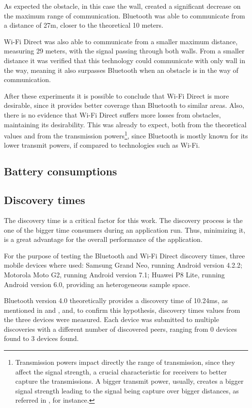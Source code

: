 As expected the obstacle, in this case the wall, created a significant decrease on the maximum range of communication. Bluetooth was able to communicate from a distance of 27m, closer to the theoretical 10 meters.

Wi-Fi Direct was also able to communicate from a smaller maximum distance, measuring 29 meters, with the signal passing through both walls. From a smaller distance it was verified that this technology could communicate with only wall in the way, meaning it also surpasses Bluetooth when an obstacle is in the way of communication.

After these experiments it is possible to conclude that Wi-Fi Direct is more desirable, since it provides better coverage than Bluetooth to similar areas. Also, there is no evidence that Wi-Fi Direct suffers more losses from obstacles, maintaining its desirability. This was already to expect, both from the theoretical values and from the transmission powers\footnote{Transmission powers impact directly the range of transmission, since they affect the signal strength, a crucial characteristic for receivers to better capture the transmissions. A bigger transmit power, usually, creates a bigger signal strength leading to the signal being capture over bigger distances, as referred in \cite{txpower}, for instance.}, since Bluetooth is mostly known for its lower transmit powers, if compared to technologies such as Wi-Fi.

\subsection{Battery consumptions}

\subsection{Discovery times}

The discovery time is a critical factor for this work. The discovery process is the one of the bigger time consumers during an application run. Thus, minimizing it, is a great advantage for the overall performance of the application.

For the purpose of testing the Bluetooth and Wi-Fi Direct discovery times, three mobile devices where used: Samsung Grand Neo, running Android version 4.2.2; Motorola Moto G2, running Android version 7.1; Huawei P8 Lite, running Android version 6.0, providing an heterogeneous sample space.

Bluetooth version 4.0 theoretically provides a discovery time of 10.24ms, as mentioned in \cite{btdisc1} and \cite{btdisc2}, and, to confirm this hypothesis, discovery times values from the three devices were measured. Each device was submitted to multiple discoveries with a different number of discovered peers, ranging from 0 devices found to 3 devices found.





